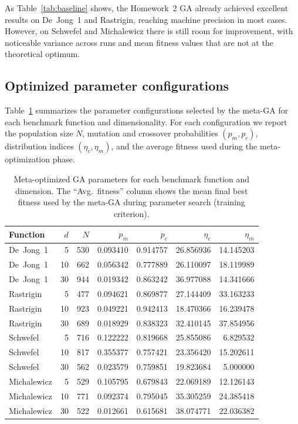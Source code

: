 \documentclass[11pt]{article}
\begin{document}
As Table~\ref{tab:baseline} shows, the Homework~2 GA already achieved
excellent results on De~Jong~1 and Rastrigin, reaching machine precision
in most cases.
However, on Schwefel and Michalewicz there is still room for improvement,
with noticeable variance across runs and mean fitness values that are not
at the theoretical optimum.

\subsection{Optimized parameter configurations}
\label{sec:opt-params}

Table~\ref{tab:opt-params} summarizes the parameter configurations selected
by the meta-GA for each benchmark function and dimensionality.
For each configuration we report the population size $N$, mutation and
crossover probabilities $(p_m, p_c)$, distribution indices
$(\eta_c,\eta_m)$, and the average fitness used during the meta-optimization
phase.

\begin{table}[t]
  \centering
  \small
  \caption{Meta-optimized GA parameters for each benchmark function and
  dimension.
The ``Avg. fitness'' column shows the mean final best fitness used by
  the meta-GA during parameter search (training criterion).}
  \label{tab:opt-params}
  \begin{tabular}{lrrrrrr}
    \toprule
    Function & $d$ & $N$ &
    $p_m$ & $p_c$ & $\eta_c$ & $\eta_m$ \\
    \midrule
    De~Jong~1 & 5  & 530 & 0.093410 & 0.914757 & 26.856936 & 14.145203 \\ 
    De~Jong~1 & 10 & 662 & 0.056342 & 0.777889 & 26.110097 & 18.119989 \\ 
    De~Jong~1 & 30 & 944 & 0.019342 & 0.863242 & 36.977088 & 14.341666 \\ 
    \midrule
    Rastrigin & 5  & 477 & 0.094621 & 0.869877 & 27.144409 & 33.163233 \\ 
    Rastrigin & 10 & 923 & 0.049221 & 0.942413 & 18.470366 & 16.239478 \\ 
    Rastrigin & 30 & 689 & 0.018929 & 0.838323 & 32.410145 & 37.854956 \\ 
    \midrule
    Schwefel & 5  & 716 & 0.122222 & 0.819668 & 25.855086 &  6.829532 \\ 
    Schwefel & 10 & 817 & 0.355377 & 0.757421 & 23.356420 & 15.202611 \\ 
    Schwefel & 30 & 562 & 0.023579 & 0.759851 & 19.823684 &  5.000000 \\ 
    \midrule
    Michalewicz & 5  & 529 & 0.105795 & 0.679843 & 22.069189 & 12.126143 \\ 
    Michalewicz & 10 & 771 & 0.092374 & 0.795045 & 35.305259 & 24.385418 \\ 
    Michalewicz & 30 & 522 & 0.012661 & 0.615681 & 38.074771 & 22.036382 \\ 
    \bottomrule
  \end{tabular}
\end{table}
\end{document}
